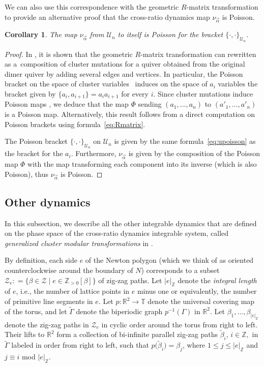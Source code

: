 \documentclass[pdftex]{sigma}
\numberwithin{equation}{section}
\newtheorem{Corollary}[Theorem]{Corollary}
\newcommand{\Z}{{\mathbb Z}}
\newcommand{\R}{{\mathbb R}}
\newcommand{\T}{{\mathbb T}}
\newcommand{\ra}{\rightarrow}
\begin{document}
	We can also use this correspondence with the geometric $R$-matrix transformation to provide an alternative proof that the cross-ratio dynamics map $\nu_{\vec\alpha}$ is Poisson.
	
	\begin{Corollary}
		The map $\nu_{\vec\alpha}$ from $\mathcal U_n$ to itself is Poisson for the bracket $\{\cdot,\cdot\}_{\mathcal U_n}$.
	\end{Corollary}
	
\begin{proof}In \cite{ILP2}, it is shown that the geometric $R$-matrix transformation can rewritten as a~composition of cluster mutations for a quiver obtained from the original dimer quiver by adding several edges and vertices. In particular, the Poisson bracket on the space of cluster variables~\cite{GSV1} induces on the space of $a_i$ variables the bracket given by $\{a_i,a_{i+1}\}=a_ia_{i+1}$ for every $i$. Since cluster mutations induce Poisson maps \cite{GSV1}, we deduce that the map $\Phi$ sending $(a_1,\dots,a_n)$ to $(a'_1,\dots,a'_n)$ is a Poisson map. Alternatively, this result follows from a direct computation on Poisson brackets using formula~\eqref{eq:Rmatrix}.
		
		The Poisson bracket $\{\cdot,\cdot\}_{\mathcal U_n}$ on $\mathcal U_n$ is given by the same formula~\eqref{eq:upoisson} as the bracket for the $a_i$. Furthermore, $\nu_{\vec\alpha}$ is given by the composition of the Poisson map $\Phi$ with the map transforming each component into its inverse (which is also Poisson), thus $\nu_{\vec\alpha}$ is Poisson.
	\end{proof}
	
\subsection{Other dynamics}\label{subsec:otherdynamics}
	In this subsection, we describe all the other integrable dynamics that are defined on the phase space of the cross-ratio dynamics integrable system, called \textit{generalized cluster modular transformations} in \cite{GeRa}.
	
By definition, each side $e$ of the Newton polygon (which we think of as oriented counterclockwise around the boundary of $N$) corresponds to a subset $\mathcal Z_e : = \{ \beta \in \mathcal Z\mid e \in \Z_{>0}[\beta]\}$ of zig-zag paths. Let $|e|_\Z$ denote the \textit{integral length} of $e$, i.e., the number of lattice points in $e$ minus one or equivalently, the number of primitive line segments in $e$. Let $p\colon \R^2 \ra \T$ denote the universal covering map of the torus, and let $\widetilde \Gamma$ denote the biperiodic graph $p^{-1}(\Gamma)$ in $\R^2$. Let $\beta_1,\dots,\beta_{|e|_{\Z}}$ denote the zig-zag paths in $\mathcal Z_e$ in cyclic order around the torus from right to left. Their lifts to $\R^2$ form a collection of bi-infinite parallel zig-zag paths $\widetilde \beta_i$, $i\in \Z,$ in $\widetilde \Gamma$ labeled in order from right to left, such that $p\big(\widetilde \beta_i\big)=\beta_{j}$, where $1\leq j\leq |e|_\Z$ and $j \equiv i $ mod $|e|_\Z$.
	
\end{document}
